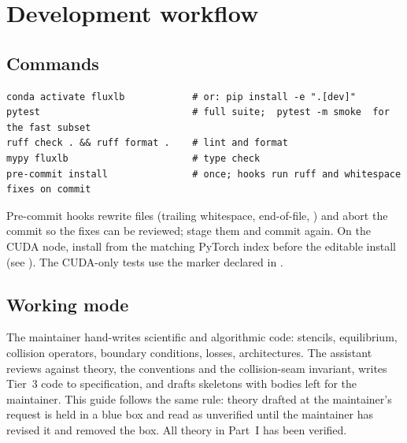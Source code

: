 
\chapter{Development workflow}

\label{Chapter7}


\section{Commands}

\begin{lstlisting}[style=sh]
conda activate fluxlb            # or: pip install -e ".[dev]"
pytest                           # full suite;  pytest -m smoke  for the fast subset
ruff check . && ruff format .    # lint and format
mypy fluxlb                      # type check
pre-commit install               # once; hooks run ruff and whitespace fixes on commit
\end{lstlisting}

Pre-commit hooks rewrite files (trailing whitespace, end-of-file, ) and
abort the commit so the fixes can be reviewed; stage them and commit again. On the CUDA node,
install  from the matching PyTorch index before the editable install (see
). The CUDA-only tests use the  marker declared in
.


\section{Working mode}

The maintainer hand-writes scientific and algorithmic code: stencils, equilibrium, collision
operators, boundary conditions, losses, architectures. The assistant reviews against theory,
the conventions and the collision-seam invariant, writes Tier~3 code to specification, and
drafts skeletons with bodies left for the maintainer. This guide follows the same rule:
theory drafted at the maintainer's request is held in a blue box and read as unverified until
the maintainer has revised it and removed the box. All theory in Part~I has been verified.


